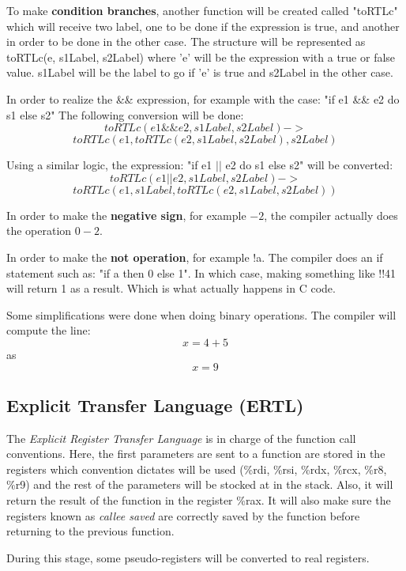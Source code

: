 \documentclass[conference]{IEEEtran}
\theoremstyle{definition}
\begin{document}
To make \textbf{condition branches}, another function will be created called "toRTLc" which will receive two label, one to be done if the expression is true, and another in order to be done in the other case. The structure will be represented as toRTLc(e, s1Label, s2Label) where 'e' will be the expression with a true or false value. s1Label will be the label to go if 'e' is true and s2Label in the other case.

In order to realize the \&\& expression, for example with the case:
"if e1 \&\& e2 do s1 else s2"
The following conversion will be done:
\[toRTLc(e1 \&\& e2, s1Label, s2Label) -> \]
\[toRTLc(e1, toRTLc(e2, s1Label, s2Label), s2Label)\]

Using a similar logic, the expression:
"if e1 $|$$|$ e2 do s1 else s2"
will be converted:
\[toRTLc(e1 || e2, s1Label, s2Label) -> \]
\[toRTLc(e1, s1Label, toRTLc(e2, s1Label, s2Label))\]

In order to make the \textbf{negative sign}, for example \(-2\), the compiler actually does the operation \(0 - 2\).

In order to make the \textbf{not operation}, for example !a. The compiler does an if statement such as:
"if a then 0 else 1".
In which case, making something like !!41 will return 1 as a result. Which is what actually happens in C code.

Some simplifications were done when doing binary operations. The compiler will compute the line:
\[ x = 4 + 5\]
as
\[x = 9\]


\subsection{Explicit Transfer Language (ERTL)}

The \textit{Explicit Register Transfer Language} is in charge of the function call conventions. Here, the first parameters are sent to a function are stored in the registers which convention dictates will be used (\%rdi, \%rsi, \%rdx, \%rcx, \%r8, \%r9) and the rest of the parameters will be stocked at in the stack. Also, it will return the result of the function in the register \%rax. It will also make sure the registers known as \textit{callee saved} are correctly saved by the function before returning to the previous function.

During this stage, some pseudo-registers will be converted to real registers.  
\end{document}

